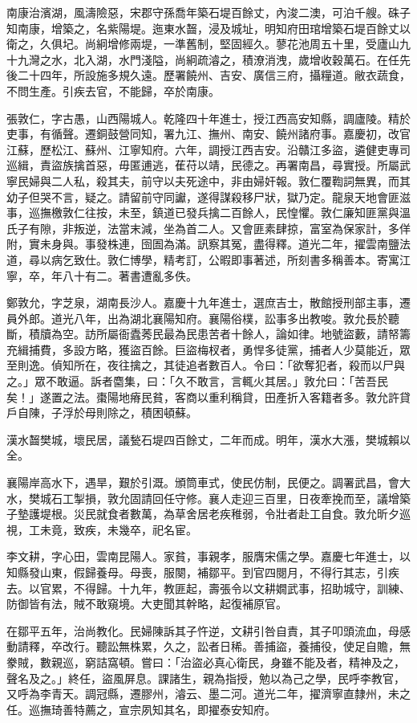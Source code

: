 \begin{pinyinscope}
南康治濱湖，風濤險惡，宋郡守孫喬年築石堤百餘丈，內浚二澳，可泊千艘。硃子知南康，增築之，名紫陽堤。迤東水齧，浸及城址，明知府田琯增築石堤百餘丈以衛之，久俱圮。尚絅增修兩堤，一準舊制，堅固經久。蓼花池周五十里，受廬山九十九灣之水，北入湖，水門淺隘，尚絅疏濬之，積潦消洩，歲增收穀萬石。在任先後二十四年，所設施多規久遠。歷署饒州、吉安、廣信三府，攝糧道。敝衣蔬食，不問生產。引疾去官，不能歸，卒於南康。

張敦仁，字古愚，山西陽城人。乾隆四十年進士，授江西高安知縣，調廬陵。精於吏事，有循聲。遷銅鼓營同知，署九江、撫州、南安、饒州諸府事。嘉慶初，改官江蘇，歷松江、蘇州、江寧知府。六年，調授江西吉安。沿贛江多盜，遴健吏專司巡緝，責盜族擒首惡，毋匿逋逃，萑苻以靖，民德之。再署南昌，尋實授。所屬武寧民婦與二人私，殺其夫，前守以夫死途中，非由婦奸報。敦仁覆鞫詞無異，而其幼子但哭不言，疑之。請留前守同讞，遂得謀殺移尸狀，獄乃定。龍泉天地會匪滋事，巡撫檄敦仁往按，未至，鎮道已發兵擒二百餘人，民惶懼。敦仁廉知匪黨與溫氏子有隙，非叛逆，法當末減，坐為首二人。又會匪素肆掠，富室為保家計，多佯附，實未身與。事發株連，囹圄為滿。訊察其冤，盡得釋。道光二年，擢雲南鹽法道，尋以病乞致仕。敦仁博學，精考訂，公暇即事著述，所刻書多稱善本。寄寓江寧，卒，年八十有二。著書遭亂多佚。

鄭敦允，字芝泉，湖南長沙人。嘉慶十九年進士，選庶吉士，散館授刑部主事，遷員外郎。道光八年，出為湖北襄陽知府。襄陽俗樸，訟事多出教唆。敦允長於聽斷，積牘為空。訪所屬衙蠹莠民最為民患苦者十餘人，論如律。地號盜藪，請帑籌充緝捕費，多設方略，獲盜百餘。巨盜梅杈者，勇悍多徒黨，捕者人少莫能近，眾至則逸。偵知所在，夜往擒之，其徒追者數百人。令曰：「欲奪犯者，殺而以尸與之。」眾不敢逼。訴者麕集，曰：「久不敢言，言輒火其居。」敦允曰：「苦吾民矣！」遂置之法。棗陽地瘠民貧，客商以重利稱貸，田產折入客籍者多。敦允許貸戶自陳，子浮於母則除之，積困頓蘇。

漢水齧樊城，壞民居，議甃石堤四百餘丈，二年而成。明年，漢水大漲，樊城賴以全。

襄陽岸高水下，遇旱，艱於引溉。頒筒車式，使民仿制，民便之。調署武昌，會大水，樊城石工掣損，敦允固請回任守修。襄人走迎三百里，日夜牽挽而至，議增築子墊護堤根。災民就食者數萬，為草舍居老疾稚弱，令壯者赴工自食。敦允昕夕巡視，工未竟，致疾，未幾卒，祀名宦。

李文耕，字心田，雲南昆陽人。家貧，事親孝，服膺宋儒之學。嘉慶七年進士，以知縣發山東，假歸養母。母喪，服闋，補鄒平。到官四閱月，不得行其志，引疾去。以官累，不得歸。十九年，教匪起，壽張令以文耕嫺武事，招助城守，訓練、防御皆有法，賊不敢窺境。大吏聞其幹略，起復補原官。

在鄒平五年，治尚教化。民婦陳訴其子忤逆，文耕引咎自責，其子叩頭流血，母感動請釋，卒改行。聽訟無株累，久之，訟者日稀。善捕盜，養捕役，使足自贍，無豢賊，數親巡，窮詰窩頓。嘗曰：「治盜必真心衛民，身雖不能及者，精神及之，聲名及之。」終任，盜風屏息。課諸生，親為指授，勉以為己之學，民呼李教官，又呼為李青天。調冠縣，遷膠州，濬云、墨二河。道光二年，擢濟寧直隸州，未之任。巡撫琦善特薦之，宣宗夙知其名，即擢泰安知府。


\end{pinyinscope}
